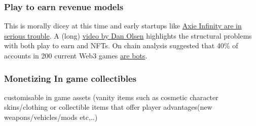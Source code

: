 \subsubsection{Play to earn revenue models}
This is morally dicey at this time and early startups like \href{https://www.bloomberg.com/news/features/2022-06-10/axie-infinity-axs-crypto-game-promised-nft-riches-gave-ruin}{Axie Infinity are in serious trouble}. A (long) \href{https://www.youtube.com/watch?v=YQ_xWvX1n9g}{video by Dan Olsen} highlights the structural problems with both play to earn and NFTs. On chain analysis suggested that 40\% of accounts in 200 current Web3 games \href{https://gallery.usejigger.com/}{are bots}. 
\subsubsection{Monetizing In game collectibles}
customisable in game assets (vanity
  items such as cosmetic character skins/clothing or collectible items
  that offer player advantages(new weapons/vehicles/mods etc,..)


